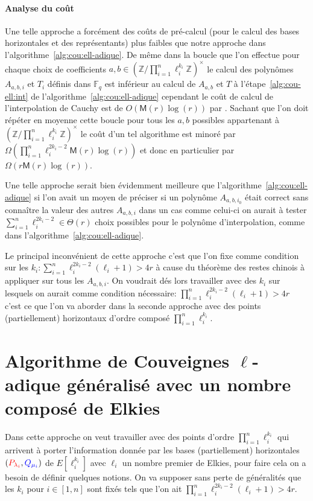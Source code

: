 \documentclass[10pt,a4paper]{book}
\theoremstyle{plain}
\theoremstyle{definition}
\theoremstyle{definition}
\theoremstyle{definition}
\theoremstyle{definition}
\theoremstyle{remark}
\theoremstyle{remark}
\theoremstyle{definition}
\begin{document}
\paragraph{Analyse du coût}
{Une telle approche a forcément des coûts de pré-calcul (pour le calcul des bases 
horizontales et des représentants) plus faibles que notre approche dans 
l'algorithme~\ref{alg:cou:ell-adique}. De même dans la boucle que l'on effectue
 pour chaque choix de coefficients $a,b \in (\mathbb{Z}/\prod_{i=1}^n\ell_i^{k_i} \mathbb{Z})^{\times}$
le calcul des polynômes $A_{a,b,i}$ et $T_i$ définis dans $\mathbb{F}_q$ est 
inférieur au calcul de $A_{a,b}$ et $T$ à l'étape~\ref{alg:cou-ell:int} de 
l'algorithme~\ref{alg:cou:ell-adique} cependant le coût de calcul de 
l'interpolation de Cauchy  est de $O(\mathsf{M}(r)\log(r))$ par
 \cite[Théorème 7.5]{algeff17}. Sachant que l'on doit répéter en moyenne cette 
boucle pour tous les $a,b$ possibles appartenant à $(\mathbb{Z}/\prod_{i=1}^n\ell_i^{k_i} \mathbb{Z})^{\times}$
 le coût d'un tel algorithme est minoré par $\Omega(\prod_{i=1}^n\ell_i^{2k_i-2}
 \mathsf{M}(r)\log(r))$ et donc en particulier par $\Omega(r\mathsf{M}(r)
 \log(r))$. 

Une telle approche serait bien évidemment meilleure que 
l'algorithme~\ref{alg:cou:ell-adique} si l'on avait un moyen de préciser si un 
polynôme $A_{a,b,i_0}$ était correct sans connaître la valeur des autres 
$A_{a,b,i}$ dans un cas comme celui-ci on aurait à tester 
$\sum_{i=1}^n \ell_i^{2k_i-2} \in \Theta(r)$ choix possibles pour le polynôme 
d'interpolation, comme dans l'algorithme~\ref{alg:cou:ell-adique}.

Le principal inconvénient de cette approche 
c'est que l'on fixe comme condition sur les $k_i: \sum_{i=1}^n\ell_i^{2k_{i}-2}(\ell_i+1)>4r$
à cause du théorème des restes chinois à appliquer sur tous les $A_{a,b,i}$. 
On voudrait dés lors travailler avec des $k_i$ sur lesquels on aurait comme 
condition nécessaire: $\prod_{i=1}^n\ell_i^{2k_{i}-2}(\ell_i+1)>4r$
c'est ce que l'on va aborder dans la seconde approche avec des points 
(partiellement) horizontaux d'ordre composé $\prod_{i=1}^n \ell_i^{k_i}$.}

\section{Algorithme de Couveignes $\ell$-adique généralisé avec un nombre composé de Elkies}
Dans cette approche on veut travailler avec des points d'ordre 
$\prod_{i=1}^{n} \ell_i^{k_i}$ qui arrivent à porter l'information donnée par 
les  bases (partiellement) horizontales 
$(\color{red}P_{\lambda_i}\color{black},\color{blue}Q_{\mu_i}\color{black})$ de 
$E[\ell_i^{k_i}]$ avec $\ell_i$ un nombre premier de Elkies, pour faire cela on
a besoin de définir quelques notions. On
va supposer sans perte de généralités que les $k_i$ pour $i \in [1,n]$ sont 
fixés tels que l'on ait $\prod_{i=1}^{n} \ell_i^{2k_i-2}(\ell_i+1)>4r$.
\end{document}
